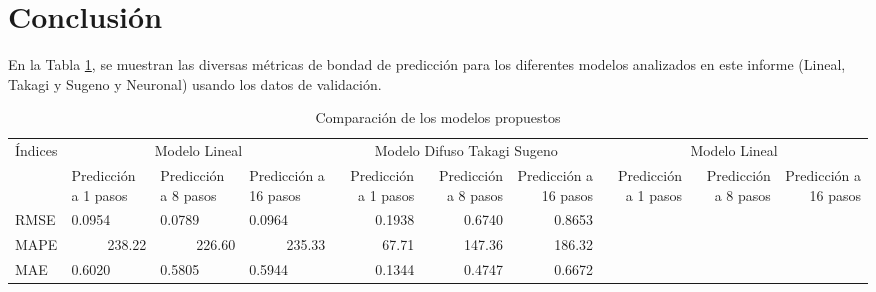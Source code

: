 \documentclass[12pt]{article}
\begin{document}
%

\newpage
\section{Conclusión}

En la Tabla \ref{t_Comp}, se muestran las diversas métricas de bondad de predicción para los diferentes modelos analizados en este informe (Lineal, Takagi y Sugeno y Neuronal) usando los datos de validación.

\begin{table}[htbp]
  \centering
  \caption{Comparación de los modelos propuestos}
    \begin{tabular}{|l|l|l|l|r|r|r|r|r|r|}
    \toprule
    Índices & \multicolumn{3}{c|}{Modelo Lineal} & \multicolumn{3}{c|}{Modelo Difuso Takagi Sugeno} & \multicolumn{3}{c|}{Modelo Lineal} \\
\cmidrule{2-10}          & \multicolumn{1}{p{4.055em}|}{Predicción a 1 pasos} & \multicolumn{1}{p{4.055em}|}{Predicción a 8 pasos} & \multicolumn{1}{p{4.055em}|}{Predicción a 16 pasos} & \multicolumn{1}{p{4.055em}|}{Predicción a 1 pasos} & \multicolumn{1}{p{4.055em}|}{Predicción a 8 pasos} & \multicolumn{1}{p{4.055em}|}{Predicción a 16 pasos} & \multicolumn{1}{p{4.055em}|}{Predicción a 1 pasos} & \multicolumn{1}{p{4.055em}|}{Predicción a 8 pasos} & \multicolumn{1}{p{4.055em}|}{Predicción a 16 pasos} \\
    \midrule
    RMSE  & 0.0954 & 0.0789 & 0.0964 & 0.1938 & 0.6740 & 0.8653 &       &       &  \\
    \midrule
    MAPE  & \multicolumn{1}{r|}{238.22} & \multicolumn{1}{r|}{226.60} & \multicolumn{1}{r|}{235.33} & 67.71 & 147.36 & 186.32 &       &       &  \\
    \midrule
    MAE   & 0.6020 & 0.5805 & 0.5944 & 0.1344 & 0.4747 & 0.6672 &       &       &  \\
    \bottomrule
    \end{tabular}%
  \label{t_Comp}%
\end{table}%
\end{document}

